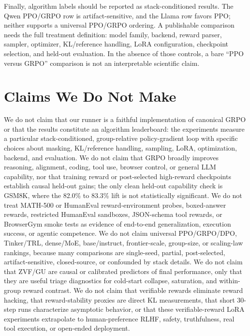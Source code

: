 Finally, algorithm labels should be reported as stack-conditioned results.
The Qwen PPO/GRPO row is artifact-sensitive, and the Llama row favors PPO;
neither supports a universal PPO/GRPO ordering.  A publishable comparison
needs the full treatment definition: model family, backend, reward parser,
sampler, optimizer, KL/reference handling, LoRA configuration, checkpoint
selection, and held-out evaluation.  In the absence of those controls, a bare
``PPO versus GRPO'' comparison is not an interpretable scientific claim.


\section*{Claims We Do Not Make}

We do not claim that our runner is a faithful implementation of canonical GRPO
or that the results constitute an algorithm leaderboard: the experiments measure
a particular stack-conditioned, group-relative policy-gradient loop with specific
choices about masking, KL/reference handling, sampling, LoRA, optimization,
backend, and evaluation.  We do not claim that GRPO broadly improves reasoning,
alignment, coding, tool use, browser control, or general LLM capability, nor
that training reward or post-selected high-reward checkpoints establish causal
held-out gains; the only clean held-out capability check is GSM8K, where the
82.0\% to 83.3\% lift is not statistically significant.  We do not treat
MATH-500 or HumanEval reward-environment probes, boxed-answer rewards,
restricted HumanEval sandboxes, JSON-schema tool rewards, or BrowserGym smoke
tests as evidence of end-to-end generalization, execution success, or agentic
competence.  We do not claim universal PPO/GRPO/DPO, Tinker/TRL, dense/MoE,
base/instruct, frontier-scale, group-size, or scaling-law rankings, because
many comparisons are single-seed, partial, post-selected, artifact-sensitive,
closed-source, or confounded by stack details.  We do not claim that ZVF/GU
are causal or calibrated predictors of final performance, only that they are
useful triage diagnostics for cold-start collapse, saturation, and within-group
reward contrast.  We do not claim that verifiable rewards eliminate reward
hacking, that reward-stability proxies are direct KL measurements, that short
30-step runs characterize asymptotic behavior, or that these verifiable-reward
LoRA experiments extrapolate to human-preference RLHF, safety, truthfulness,
real tool execution, or open-ended deployment.
